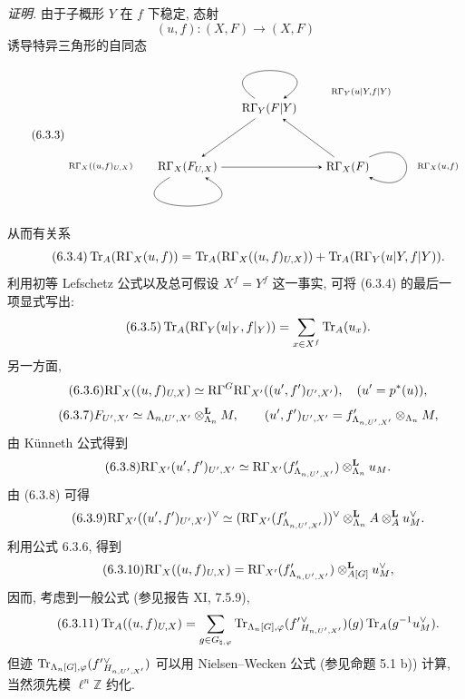 \emph{证明.} 由于子概形 $Y$ 在 $f$ 下稳定, 态射
\[
(u,f):(X,F)\longrightarrow(X,F)
\]
诱导特异三角形的自同态
\begin{equation}
\tag{6.3.3}
\begin{tikzpicture}[baseline=(current bounding box.center),>=stealth]
\node (Y) at (0,1.75) {$\RG_Y(F|Y)$};
\node (U) at (-2.45,0) {$\RG_X(F_{U,X})$};
\node (X) at (2.35,0) {$\RG_X(F)$};
\node at (2.75,2.25) {$\scriptstyle\RG_Y(u|Y,f|Y)$};
\node at (-5.05,0.02) {$\scriptstyle\RG_X((u,f)_{U,X})$};
\node at (5.05,0.02) {$\scriptstyle\RG_X(u,f)$};
\draw[->] (Y) to[out=145,in=35,looseness=5.8] (Y);
\draw[->] (U) to[out=210,in=-30,looseness=5.5] (U);
\draw[->] (X) to[out=25,in=-25,looseness=7] (X);
\draw[->] (Y) -- (U);
\draw[->] (U) -- (X);
\draw[->] (X) -- (Y);
\end{tikzpicture}
\end{equation}
从而有关系
\begin{equation}
\tag{6.3.4}
\operatorname{Tr}_A(\mathrm R\Gamma_X(u,f))=
\operatorname{Tr}_A(\mathrm R\Gamma_X((u,f)_{U,X}))+
\operatorname{Tr}_A(\mathrm R\Gamma_Y(u|Y,f|Y)).
\end{equation}
利用初等 Lefschetz 公式以及总可假设 $X^f=Y^f$ 这一事实, 可将 (6.3.4) 的最后一项显式写出:
\begin{equation}
\tag{6.3.5}
\operatorname{Tr}_A(\mathrm R\Gamma_Y(u|_Y,f|_Y))=\sum_{x\in X^f}\operatorname{Tr}_A(u_x).
\end{equation}
另一方面,
\begin{equation}
\tag{6.3.6}
\mathrm R\Gamma_X((u,f)_{U,X})\simeq \mathrm R\Gamma^G\mathrm R\Gamma_{X'}((u',f')_{U',X'}),\quad (u'=p^*(u)),
\end{equation}
\begin{equation}
\tag{6.3.7}
F_{U',X'}\simeq \Lambda_{n,U',X'}\otimes_{\Lambda_n}^{\mathbf L}M,
\qquad
(u',f')_{U',X'}=f'_{\Lambda_{n,U',X'}}\otimes_{\Lambda_n}M,
\end{equation}
由 Künneth 公式得到
\begin{equation}
\tag{6.3.8}
\mathrm R\Gamma_{X'}(u',f')_{U',X'}\simeq
\mathrm R\Gamma_{X'}(f'_{\Lambda_{n,U',X'}})\otimes_{\Lambda_n}^{\mathbf L}u_M.
\end{equation}
由 (6.3.8) 可得
\begin{equation}
\tag{6.3.9}
\mathrm R\Gamma_{X'}((u',f')_{U',X'})^\vee\simeq
(\mathrm R\Gamma_{X'}(f'_{\Lambda_{n,U',X'}}))^\vee\otimes_{\Lambda_n}^{\mathbf L}A\otimes_A^{\mathbf L}u_M^\vee.
\end{equation}
利用公式 6.3.6, 得到
\begin{equation}
\tag{6.3.10}
\mathrm R\Gamma_X((u,f)_{U,X})=\mathrm R\Gamma_{X'}(f'_{\Lambda_{n,U',X'}})\otimes_{A[G]}^{\mathbf L}u_M^\vee,
\end{equation}
因而, 考虑到一般公式 (参见报告 XI, 7.5.9),
\begin{equation}
\tag{6.3.11}
\operatorname{Tr}_A((u,f)_{U,X})=
\sum_{g\in G_{\natural,\varphi}}\operatorname{Tr}_{\Lambda_n[G],\varphi}(f'{}^\vee_{H_{n,U',X'}})(g)\operatorname{Tr}_A(g^{-1}u_M^\vee).
\end{equation}
但迹 $\operatorname{Tr}_{\Lambda_n[G],\varphi}(f'{}^\vee_{H_{n,U',X'}})$ 可以用 Nielsen--Wecken 公式 (参见命题 5.1 b)) 计算, 当然须先模 $\ell^n\mathbb Z$ 约化.

